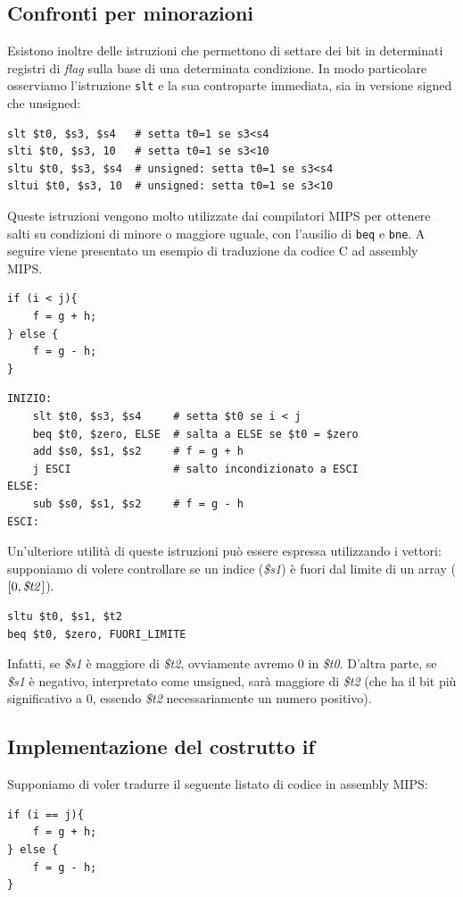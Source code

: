 \documentclass[class=book, crop=false]{standalone}
\begin{document}
\subsection*{Confronti per minorazioni}
Esistono inoltre delle istruzioni che permettono di settare dei bit in determinati registri di \emph{flag} sulla base di una determinata condizione. In modo particolare osserviamo l'istruzione \texttt{slt} e la sua controparte immediata, sia in versione signed che unsigned:
\begin{verbatim}
slt $t0, $s3, $s4   # setta t0=1 se s3<s4
slti $t0, $s3, 10   # setta t0=1 se s3<10
sltu $t0, $s3, $s4  # unsigned: setta t0=1 se s3<s4
sltui $t0, $s3, 10  # unsigned: setta t0=1 se s3<10
\end{verbatim}
Queste istruzioni vengono molto utilizzate dai compilatori MIPS per ottenere salti su condizioni di minore o maggiore uguale, con l'ausilio di \texttt{beq} e \texttt{bne}. A seguire viene presentato un esempio di traduzione da codice C ad assembly MIPS.
\begin{verbatim}
if (i < j){
	f = g + h;
} else {
	f = g - h;
}
\end{verbatim}
\begin{verbatim}
INIZIO:
	slt $t0, $s3, $s4     # setta $t0 se i < j
	beq $t0, $zero, ELSE  # salta a ELSE se $t0 = $zero
	add $s0, $s1, $s2     # f = g + h
	j ESCI                # salto incondizionato a ESCI
ELSE:
	sub $s0, $s1, $s2     # f = g - h
ESCI:
\end{verbatim}
Un'ulteriore utilità di queste istruzioni può essere espressa utilizzando i vettori: supponiamo di volere controllare se un indice (\emph{\$s1}) è fuori dal limite di un array (\([0, \text{\emph{\$t2}}]\)).
\begin{verbatim}
sltu $t0, $s1, $t2
beq $t0, $zero, FUORI_LIMITE
\end{verbatim}
Infatti, se \emph{\$s1} è maggiore di \emph{\$t2}, ovviamente avremo 0 in \emph{\$t0}. D'altra parte, se \emph{\$s1} è negativo, interpretato come unsigned, sarà maggiore di \emph{\$t2} (che ha il bit più significativo a 0, essendo \emph{\$t2} necessariamente un numero positivo).

\subsection*{Implementazione del costrutto if}
Supponiamo di voler tradurre il seguente listato di codice in assembly MIPS:
\begin{verbatim}
if (i == j){
	f = g + h;
} else {
	f = g - h;
}
\end{verbatim}
\end{document}
